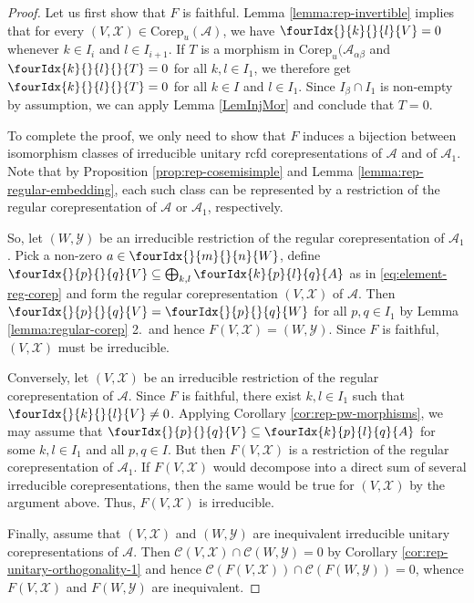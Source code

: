 \documentclass[10pt]{article}
\newcommand{\Corep}{\mathrm{Corep}}
\newcommand{\Gr}[5]{\fourIdx{#2}{#4}{#3}{#5}{#1}}%
\newcommand{\Gru}[3]{\Gr{#1}{}{}{#2}{#3}}
\newcommand{\Grd}[3]{\Gr{#1}{#2}{#3}{}{}}
\theoremstyle{definition}
\numberwithin{equation}{section}
\begin{document}
\begin{proof}
Let us first show that $F$ is faithful.  Lemma
\ref{lemma:rep-invertible} implies that for every $(V,\mathscr{X}) \in
\Corep_u(\mathscr{A})$, we have $\Gru{V}{k}{l}=0$ whenever $k\in
I_{i}$ and $l\in I_{i+1}$.  If $T$ is a morphism in
$\Corep_u(\mathscr{A}_{\alpha\beta}$ and $\Grd{T}{k}{l}=0$ for all
$k,l \in I_{1}$, we therefore get $\Grd{T}{k}{l}=0$ for all $k\in I$
and $l\in I_{1}$. Since $I_{\beta}\cap I_{1}$ is non-empty by
assumption, we can apply Lemma \ref{LemInjMor} and conclude that
$T=0$.

To complete the proof, we only need to show that $F$ induces a
bijection between isomorphism classes of irreducible unitary rcfd
corepresentations of $\mathcal{A}$ and of $\mathcal{A}_{1}$. Note that
by Proposition \ref{prop:rep-cosemisimple} and Lemma
\ref{lemma:rep-regular-embedding}, each such class can be represented
by a restriction of the regular corepresentation of $\mathcal{A}$ or
$\mathcal{A}_{1}$, respectively.


So, let $(W,\mathscr{Y})$ be an irreducible restriction of the regular
corepresentation of $\mathcal{A}_{1}$. Pick a non-zero $a \in
\Gru{W}{m}{n}$, define $\Gru{V}{p}{q} \subseteq \bigoplus_{k,l}
\Gr{A}{k}{l}{p}{q}$ as in \eqref{eq:element-reg-corep} and form the
regular corepresentation $(V,\mathscr{X})$ of $\mathscr{A}$. Then
$\Gru{V}{p}{q} = \Gru{W}{p}{q}$ for all $p,q\in I_{1}$ by Lemma
\ref{lemma:regular-corep} 2.\ and hence $F(V,\mathscr{X}) =
(W,\mathscr{Y})$.  Since $F$ is faithful, $(V,\mathscr{X})$ must be
irreducible.

Conversely, let $(V,\mathscr{X})$ be an irreducible restriction of the
regular corepresentation of $\mathcal{A}$. Since $F$ is faithful,
there exist $k,l\in I_{1}$ such that $\Gru{V}{k}{l}\neq 0$. Applying
Corollary \ref{cor:rep-pw-morphisms}, we may assume that
$\Gru{V}{p}{q} \subseteq \Gr{A}{k}{l}{p}{q}$ for some $k,l\in I_{1}$
and all $p,q\in I$. But then $F(V,\mathscr{X})$ is a restriction of
the regular corepresentation of $\mathcal{A}_{1}$.  If
$F(V,\mathscr{X})$ would decompose into a direct sum of several
irreducible corepresentations, then the same would be true for
$(V,\mathscr{X})$ by the argument above. Thus, $F(V,\mathscr{X})$ is irreducible.

Finally, assume that
$(V,\mathscr{X})$ and $(W,\mathscr{Y})$ are 
inequivalent irreducible unitary corepresentations of $\mathcal{A}$. Then $\mathcal{C}(V,\mathscr{X}) \cap
\mathcal{C}(W,\mathscr{Y})=0$ by Corollary \ref{cor:rep-unitary-orthogonality-1} and hence $\mathcal{C}(F(V,\mathscr{X}))
\cap\mathcal{C}(F(W,\mathscr{Y})) =0$, whence $F(V,\mathscr{X})$ and
$F(W,\mathscr{Y})$ are inequivalent.  
\end{proof}
\end{document}
